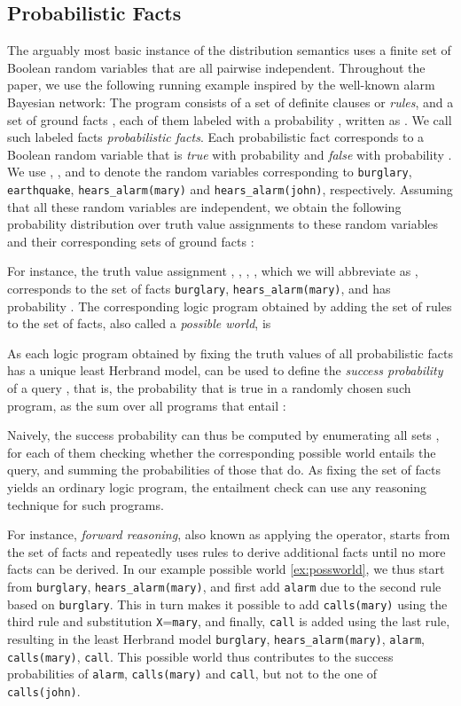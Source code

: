\documentclass[a4paper]{article}
\begin{document}
\subsection{Probabilistic Facts}
The arguably most basic instance of the distribution semantics uses a
finite set of Boolean random variables that are all pairwise
independent. Throughout the paper, we use the following running example inspired
by the well-known alarm Bayesian network: 
\label{page:alarm}
The program consists of a set  of definite clauses or \emph{rules},
and a set  of ground facts , each of them
labeled with a probability , written as . We call such
labeled facts \emph{probabilistic facts}. Each probabilistic fact
corresponds to a Boolean random
variable that is \emph{true} with probability  and \emph{false} with
probability . We use , ,  and  to denote the random
variables corresponding to \verb|burglary|, \verb|earthquake|,
\verb|hears_alarm(mary)| and \verb|hears_alarm(john)|, respectively. 
Assuming that all these random variables are
independent, we obtain the following probability distribution 
over truth value assignments to these random variables and their
corresponding  sets
of ground facts :

For instance, the truth value assignment ,
, , , which we will abbreviate as , corresponds to the set of facts \verb|burglary|,
\verb|hears_alarm(mary)|, and has probability . The corresponding logic
program obtained by adding the set of rules  to the set of facts,
also called a \emph{possible world}, is 

As each logic program obtained by fixing the truth values of all
probabilistic facts has a unique least Herbrand model,  can be
used to define the \emph{success probability} of a query , that is,
the probability that  is true in a randomly chosen such program,
as the sum over all programs that entail :

Naively, the success probability can thus be computed by enumerating
all sets , for each of them checking whether
the corresponding possible world entails the query, and summing the
probabilities of those that do. As fixing the set of facts yields an
ordinary logic program, the entailment check can use any reasoning
technique for such programs.
 
For instance, \emph{forward reasoning}, also
known as applying the  operator, starts from the set of
facts and repeatedly uses rules to derive additional facts until no more facts
can be derived. In our example possible world \eqref{ex:possworld}, we thus start 
from \verb|burglary|, \verb|hears_alarm(mary)|, and first add \verb|alarm| due to the
second rule based on \verb|burglary|. This in turn makes it possible
to add \verb|calls(mary)| using the third rule and substitution
\verb|X|=\verb|mary|, and finally, \verb|call| is added using the last rule,
resulting in the least Herbrand model \verb|burglary|,
\verb|hears_alarm(mary)|, \verb|alarm|, \verb|calls(mary)|,
\verb|call|. This possible world thus contributes to the success
probabilities of \verb|alarm|, \verb|calls(mary)| and \verb|call|, but
not to the one of \verb|calls(john)|. 
\end{document}
